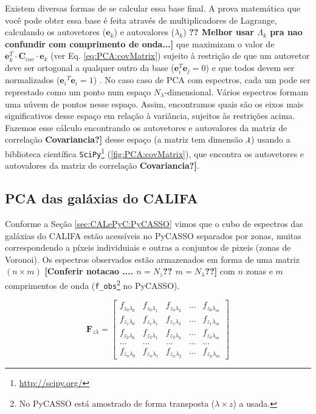 Existem diversas formas de se calcular essa base final. A prova matemática que
você pode obter essa base é feita através de multiplicadores de Lagrange,
calculando os autovetores ($\mathbf{e}{}_k$) e autovalores  ($\lambda_k$) {\bf\ojo ?? Melhor usar $\Lambda_k$ pra nao confundir com comprimento de onda...]} que
maximizam o valor de $\mathbf{e}{}_k^T \cdot \mathbf{C}{}_{cov} \cdot
\mathbf{e}{}_k$ (ver Eq. \ref{eq:PCA:covMatrix}) sujeito à restrição de que um
autovetor deve ser ortogonal a qualquer outro da base ($\mathbf{e}{}_i^T
\mathbf{e}{}_j = 0$) e que todos devem ser normalizados ($\mathbf{e}{}_i{}^T
\mathbf{e}{}_i = 1$) \citep[][p. 5-6]{JolliffePCA1986}. No caso caso de PCA com
espectros, cada um pode ser represtado como um ponto num espaço
\ojo$N_\lambda$-dimensional. Vários espectros formam uma núvem de pontos nesse espaço. Assim,
encontramos quais são os eixos mais significativos desse espaço em relação à
variância, sujeitos às restrições acima. Fazemos esse cálculo encontrando os
autovetores e autovalores da matriz de correlação {\bf \ojo Covariancia?]} desse espaço (a matriz tem
dimensão $\lambda \time \lambda$) usando a biblioteca científica
\texttt{SciPy}\footnote{\url{http://scipy.org/}} (\ref{fig:PCA:covMatrix}), que
encontra os autovetores e autovalores da matriz de correlação {\bf \ojo Covariancia?]}.

\subsection{PCA das galáxias do CALIFA}

Conforme a Seção \ref{sec:CALePyC:PyCASSO} vimos que o cubo de espectros das
galáxias do CALIFA estão acessíveis no PyCASSO separados por zonas, muitas correspondendo a píxeis individuiais e outras a conjuntos de pixeis (zonas de Voronoi). Os espectros
observados estão armazenados em forma de uma matriz $(n \times m)$ 
{\bf [\ojo Conferir notacao .... $n = N_z$?? $m = N_\lambda$??]} 
com $n$ zonas
e $m$ comprimentos de onda (\texttt{f\_obs}\footnote{No PyCASSO está amostrado
de forma transposta ($\lambda \times z$) a usada.} no PyCASSO). 

\begin{equation}
    \label{eq:PCA:fluxMatrix}
    \textbf{F}{}_{z \lambda} = \left[
    \begin{array}{ccccc}
        f_{z_0 \lambda_0} & f_{z_0 \lambda_1} & f_{z_0 \lambda_2} & ... & f_{z_0 \lambda_m} \\
        f_{z_1 \lambda_0} & f_{z_1 \lambda_1} & f_{z_1 \lambda_2} & ... & f_{z_1 \lambda_m} \\
        f_{z_2 \lambda_0} & f_{z_2 \lambda_1} & f_{z_2 \lambda_2} & ... & f_{z_2 \lambda_m} \\
        ...               & ...               & ...               & ... & ...               \\
        f_{z_n \lambda_0} & f_{z_n \lambda_1} & f_{z_n \lambda_2} & ... & f_{z_n \lambda_m} 
    \end{array} 
    \right]
\end{equation}

